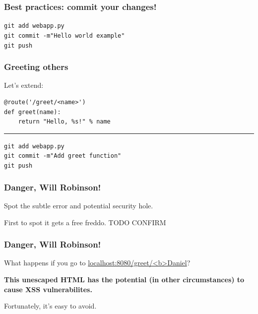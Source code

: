 \documentclass{beamer}
\begin{document}
\begin{frame}
\frametitle{Best practices: commit your changes!}
\texttt{git add webapp.py}\\
\texttt{git commit -m"Hello world example"}\\
\texttt{git push}
\end{frame}

\begin{frame}[fragile]
  \frametitle{Greeting others}
  Let's extend:
  \begin{verbatim}
@route('/greet/<name>')
def greet(name):
    return "Hello, %s!" % name
  \end{verbatim}

  \hrule
  \texttt{git add webapp.py}\\
  \texttt{git commit -m"Add greet function"}\\
  \texttt{git push}
\end{frame}

\begin{frame}
  \frametitle{Danger, Will Robinson!}
  Spot the subtle error and potential security hole.

  First to spot it gets a free freddo. TODO CONFIRM
\end{frame}

\begin{frame}
  \frametitle{Danger, Will Robinson!}

  What happens if you go to \url{localhost:8080/greet/<b>Daniel}?

  \textbf{This unescaped HTML has the potential (in other
    circumstances) to cause XSS vulnerabilites.}

  Fortunately, it's easy to avoid.
\end{frame}

\end{document}
